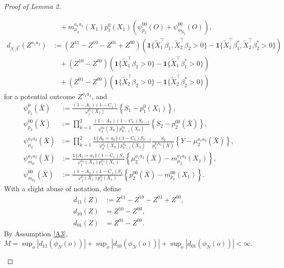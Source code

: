 \documentclass{article}
\newcommand{\pk}{{\varphi}}
\begin{document}
\begin{proof}[Proof of Lemma 2]
\begin{enumerate}
\begin{align*}
			&\;\quad+ m_{\mu_2}^{a_1a_2}(X_1) p_1^0(X_1) (\psi_{p_2}^{00}(O) + \psi_{m_{p_2}}^{00}(O)),
		\end{align*}
		\begin{align*}
			d_{\beta,\beta^*}(Z^{a_1a_2}) 
			&:= (Z^{11} - Z^{10} - Z^{01} + Z^{00}) \left( \mathbf1\{\tilde X_1^\intercal \beta_1, \tilde X_2^\intercal \beta_2 > 0\} - \mathbf1\{\tilde X_1^\intercal \beta_1^*, \tilde X_2^\intercal \beta_2^* > 0\} \right) \\
			&\quad+ (Z^{10} - Z^{00}) \left(\mathbf1\{\tilde X_1^\intercal \beta_1 > 0\} - \mathbf1\{\tilde X_1^\intercal \beta_1^* > 0\}\right) \\
			&\quad+ (Z^{01} - Z^{00}) \left(\mathbf1\{\tilde X_2^\intercal \beta_2 > 0\} - \mathbf1\{\tilde X_2^\intercal \beta_2^* > 0\}\right)
		\end{align*} 
		for a potential outcome $Z^{a_1a_2}$, and
		\begin{align*}
			\psi_{p_1}^{0}(\bar X) 
			&:= \frac{(1-A_1)(1-C_1)}{\pk_1^{0}(X_1)} \left\{ S_1 - p_1^{0}(X_1) \right\}, \\
			\psi_{p_2}^{00}(\bar X) 
			&:= \prod_{k=1}^2\frac{(1-A_k)(1-C_k)S_{k-1}}{\pk_k^{\bar 0_k}(\bar X_k) p_{k-1}^{\bar 0_k}(\bar X_k)} \left\{ S_2 - p_2^{00}(\bar X) \right\}, \\
			\psi_{\mu_2}^{a_1a_2}(\bar X) 
			&:= \prod_{k=1}^2\frac{\mathbb 1\{A_k = a_k \}(1-C_k)S_{k-1}}{\pk_k^{\bar a_k}(\bar X_k) p_{k-1}^{\bar a_k}(\bar X_k)} \frac{S_2}{p_2^{a_1a_2}(\bar X)} \left\{ Y - \mu_2^{a_1a_2}(\bar X) \right\}, \\
			\psi_{m_{\mu}}^{a_1a_2}(\bar X) 
			&:= \frac{\mathbb 1\{A_1 = a_1 \}(1-C_1)S_1}{\pk_1^{a_1}(X_1) p_1^{a_1}(X_1)} \left\{ \mu_2^{a_1a_2}(\bar X) - m_{\mu_2}^{a_1a_2}(X_1) \right\}, \\
			\psi_{m_{p_2}}^{00}(\bar X) 
			&:= \frac{(1-A_1)(1-C_1)S_1}{\pk_1^{0}(X_1) p_1^{0}(X_1)} \left\{ p_2^{00}(\bar X) - m_{p_2}^{00}(X_1) \right\}.
		\end{align*}
		With a slight abuse of notation, define
		\begin{align*}
			d_{11}(Z) &:= Z^{11} - Z^{10} - Z^{01} + Z^{00}, \\
			d_{10}(Z) &= Z^{10} - Z^{00}, \\
			d_{01}(Z) &= Z^{01} - Z^{00}.
		\end{align*} 
		By Assumption \ref{A3}, %
		$M = \sup_{o} | d_{11}( \phi_N(o) ) | + \sup_{o} | d_{10}( \phi_N(o) ) | + \sup_{o} | d_{01}( \phi_N(o) ) | < \infty.$
		

\end{enumerate}
\end{proof}
\end{document}
